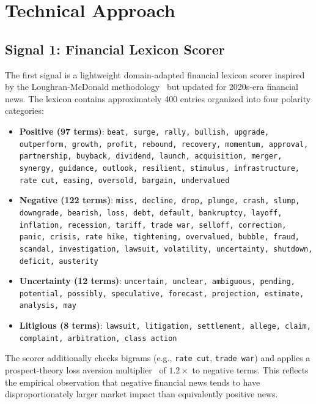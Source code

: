 \section{Technical Approach}
\label{sec:approach}

\subsection{Signal 1: Financial Lexicon Scorer}

The first signal is a lightweight domain-adapted financial lexicon scorer inspired by the Loughran-McDonald methodology~\cite{loughran2011liability} but updated for 2020s-era financial news. The lexicon contains approximately 400 entries organized into four polarity categories:

\begin{itemize}
    \item \textbf{Positive (97 terms)}: \texttt{beat, surge, rally, bullish, upgrade, outperform, growth, profit, rebound, recovery, momentum, approval, partnership, buyback, dividend, launch, acquisition, merger, synergy, guidance, outlook, resilient, stimulus, infrastructure, rate cut, easing, oversold, bargain, undervalued}
    \item \textbf{Negative (122 terms)}: \texttt{miss, decline, drop, plunge, crash, slump, downgrade, bearish, loss, debt, default, bankruptcy, layoff, inflation, recession, tariff, trade war, selloff, correction, panic, crisis, rate hike, tightening, overvalued, bubble, fraud, scandal, investigation, lawsuit, volatility, uncertainty, shutdown, deficit, austerity}
    \item \textbf{Uncertainty (12 terms)}: \texttt{uncertain, unclear, ambiguous, pending, potential, possibly, speculative, forecast, projection, estimate, analysis, may}
    \item \textbf{Litigious (8 terms)}: \texttt{lawsuit, litigation, settlement, allege, claim, complaint, arbitration, class action}
\end{itemize}

The scorer additionally checks bigrams (e.g., \texttt{rate cut}, \texttt{trade war}) and applies a prospect-theory loss aversion multiplier~\cite{kahneman1979prospect} of $1.2\times$ to negative terms. This reflects the empirical observation that negative financial news tends to have disproportionately larger market impact than equivalently positive news.

